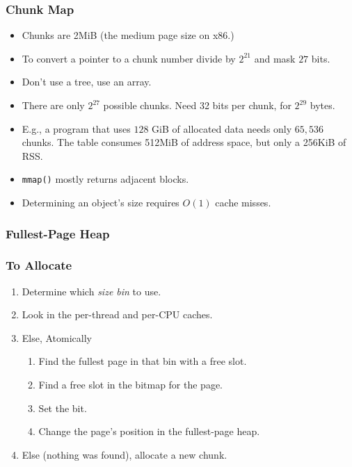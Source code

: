 \documentclass[xcolor=dvipsnames,14pt]{beamer}
\begin{document}
\begin{frame}[fragile]
\frametitle{Chunk Map}

\begin{itemize}
\item Chunks are 2MiB (the medium page size on x86.)

\item To convert a pointer to a chunk number divide by $2^{21}$ and mask $27$ bits.

\item Don't use a tree, use an array.

\item There are only $2^{27}$ possible chunks.  Need 32 bits per chunk, for
$2^{29}$ bytes.

\item E.g., a program that uses $128$ GiB of allocated data needs only
  $65,536$ chunks.  The table consumes 512MiB of address space, but
  only a 256KiB of RSS.

\item \texttt{mmap()} mostly returns adjacent blocks.

\item Determining an object's size requires $O(1)$ cache misses.
\end{itemize}

\end{frame}

\begin{frame}
\frametitle{Fullest-Page Heap}

\end{frame}

\begin{frame}
\frametitle{To Allocate}


\begin{enumerate}
\item Determine which \textit{size bin} to use.
\item Look in the per-thread and per-CPU caches.
\item Else, Atomically 
  \begin{enumerate}
  \item Find the fullest page in that bin with a free slot.
  \item Find a free slot in the bitmap for the page.
  \item Set the bit.
  \item Change the page's position in the fullest-page heap.
  \end{enumerate}
\item Else (nothing was found), allocate a new chunk.
\end{enumerate}
\end{frame}
\end{document}
